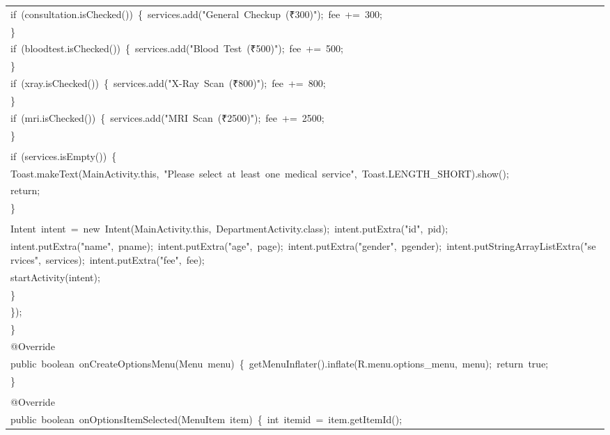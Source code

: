\documentclass[a4paper,12pt]{article}
\begin{document}
\begin{longtable}{|p{}|}
{\ttfamily\small if\ (consultation.isChecked())\ \{\ services.add("General\ Checkup\ (₹300)");\ fee\ +=\ 300;} \\
{\ttfamily\small \}} \\
{\ttfamily\small if\ (bloodtest.isChecked())\ \{\ services.add("Blood\ Test\ (₹500)");\ fee\ +=\ 500;} \\
{\ttfamily\small \}} \\
{\ttfamily\small if\ (xray.isChecked())\ \{\ services.add("X-Ray\ Scan\ (₹800)");\ fee\ +=\ 800;} \\
{\ttfamily\small \}} \\
{\ttfamily\small if\ (mri.isChecked())\ \{\ services.add("MRI\ Scan\ (₹2500)");\ fee\ +=\ 2500;} \\
{\ttfamily\small \}} \\
\strut \\
{\ttfamily\small if\ (services.isEmpty())\ \{} \\
{\ttfamily\small Toast.makeText(MainActivity.this,\ "Please\ select\ at\ least\ one\ medical\ service",\ Toast.LENGTH\_SHORT).show();} \\
{\ttfamily\small return;} \\
{\ttfamily\small \}} \\
\strut \\
{\ttfamily\small Intent\ intent\ =\ new\ Intent(MainActivity.this,\ DepartmentActivity.class);\ intent.putExtra("id",\ pid);} \\
{\ttfamily\small intent.putExtra("name",\ pname);\ intent.putExtra("age",\ page);\ intent.putExtra("gender",\ pgender);\ intent.putStringArrayListExtra("services",\ services);\ intent.putExtra("fee",\ fee);} \\
{\ttfamily\small startActivity(intent);} \\
{\ttfamily\small \}} \\
{\ttfamily\small \});} \\
{\ttfamily\small \}} \\
{\ttfamily\small @Override} \\
{\ttfamily\small public\ boolean\ onCreateOptionsMenu(Menu\ menu)\ \{\ getMenuInflater().inflate(R.menu.options\_menu,\ menu);\ return\ true;} \\
{\ttfamily\small \}} \\
\strut \\
{\ttfamily\small @Override} \\
{\ttfamily\small public\ boolean\ onOptionsItemSelected(MenuItem\ item)\ \{\ int\ itemid\ =\ item.getItemId();} \\

\end{longtable}
\end{document}
